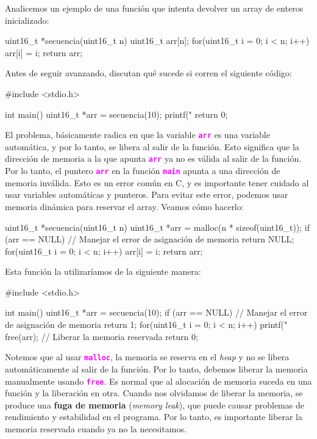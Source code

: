 \documentclass[]{scrartcl}
\newcommand{\hl}[1]{\textcolor{magenta}{\textbf{\texttt{#1}}}}
\begin{document}
Analicemos un ejemplo de una función que intenta devolver un array de enteros inicializado:

\begin{cbox}[]{}
  uint16_t *secuencia(uint16_t n){
    uint16_t arr[n];
    for(uint16_t i = 0; i < n; i++)
      arr[i] = i;
    return arr;
  }
\end{cbox}

\begin{exbox}
Antes de seguir avanzando, discutan qué sucede si corren el siguiente código:
\begin{cbox}[]{}
  #include <stdio.h>

  int main(){
    uint16_t *arr = secuencia(10);
    printf("%
    return 0;
  }
\end{cbox}

\end{exbox}

El problema, básicamente radica en que la variable \hl{arr} es una variable automática, y por lo tanto, se libera al salir de la función. Esto significa que la dirección de memoria a la que apunta \hl{arr} ya no es válida al salir de la función. Por lo tanto, el puntero \hl{arr} en la función \hl{main} apunta a una dirección de memoria inválida.
Esto es un error común en C, y es importante tener cuidado al usar variables automáticas y punteros. Para evitar este error, podemos usar memoria dinámica para reservar el array. Veamos cómo hacerlo:
\begin{cbox}[]{}
  uint16_t *secuencia(uint16_t n){
    uint16_t *arr = malloc(n * sizeof(uint16_t));
    if (arr == NULL) {
      // Manejar el error de asignación de memoria
      return NULL;
    }
    for(uint16_t i = 0; i < n; i++)
      arr[i] = i;
    return arr;
  }
\end{cbox}

Esta función la utilizaríamos de la siguiente manera:

\begin{cbox}[]{}
  #include <stdio.h>

  int main(){
    uint16_t *arr = secuencia(10);
    if (arr == NULL) {
      // Manejar el error de asignación de memoria
      return 1;
    }
    for(uint16_t i = 0; i < n; i++)
      printf("%
    free(arr); // Liberar la memoria reservada
    return 0;
  }
\end{cbox}

Notemos que al usar \hl{malloc}, la memoria se reserva en el \textit{heap} y no se libera automáticamente al salir de la función. Por lo tanto, debemos liberar la memoria manualmente usando \hl{free}. Es normal que al alocación de memoria suceda en una función y la liberación en otra. Cuando nos olvidamos de liberar la memoria, se produce una \textbf{fuga de memoria} (\textit{memory leak}), que puede causar problemas de rendimiento y estabilidad en el programa. Por lo tanto, es importante liberar la memoria reservada cuando ya no la necesitamos.
\end{document}
